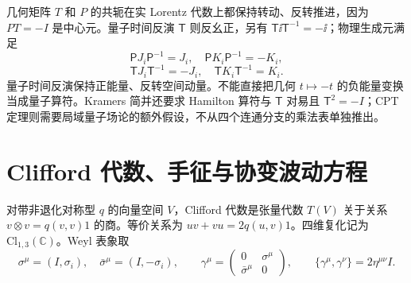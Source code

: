 \begin{note}[几何时间反演与量子时间反演]
几何矩阵 $T$ 和 $P$ 的共轭在实 Lorentz 代数上都保持转动、反转推进，因为 $PT=-I$ 是中心元。量子时间反演 $\mathsf T$ 则反幺正，另有 $\mathsf T\ii\mathsf T^{-1}=-\ii$；物理生成元满足
\begin{equation}
 \mathsf P J_i\mathsf P^{-1}=J_i,\quad \mathsf P K_i\mathsf P^{-1}=-K_i,
 \label{eq:parity-action}
\end{equation}
\begin{equation}
 \mathsf T J_i\mathsf T^{-1}=-J_i,\quad \mathsf T K_i\mathsf T^{-1}=K_i.
 \label{eq:time-reversal-action}
\end{equation}
量子时间反演保持正能量、反转空间动量。不能直接把几何 $t\mapsto-t$ 的负能量变换当成量子算符。Kramers 简并还要求 Hamilton 算符与 $\mathsf T$ 对易且 $\mathsf T^2=-I$；CPT 定理则需要局域量子场论的额外假设，不从四个连通分支的乘法表单独推出。
\end{note}

\section{Clifford 代数、手征与协变波动方程}

\begin{definition}
对带非退化对称型 $q$ 的向量空间 $V$，Clifford 代数是张量代数 $T(V)$ 关于关系 $v\otimes v=q(v,v)1$ 的商。等价关系为 $uv+vu=2q(u,v)1$。四维复化记为 $\mathrm{Cl}_{1,3}(\mathbb C)$。Weyl 表象取
\[
 \sigma^\mu=(I,\sigma_i),\quad \bar\sigma^\mu=(I,-\sigma_i),\qquad
 \gamma^\mu=\begin{pmatrix}0&\sigma^\mu\\\bar\sigma^\mu&0\end{pmatrix},
 \qquad \{\gamma^\mu,\gamma^\nu\}=2\eta^{\mu\nu}I.
\]
\end{definition}

